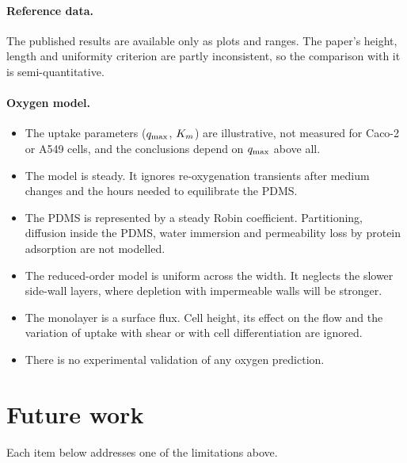 \paragraph{Reference data.} The published results are available only as plots and ranges. The paper's height, length and uniformity criterion are partly inconsistent, so the comparison with it is semi-quantitative.

\paragraph{Oxygen model.}
\begin{itemize}
\item The uptake parameters ($q_{\max}$, $K_{m}$) are illustrative, not measured for Caco-2 or A549 cells, and the conclusions depend on $q_{\max}$ above all.
\item The model is steady. It ignores re-oxygenation transients after medium changes and the hours needed to equilibrate the PDMS.
\item The PDMS is represented by a steady Robin coefficient. Partitioning, diffusion inside the PDMS, water immersion and permeability loss by protein adsorption are not modelled.
\item The reduced-order model is uniform across the width. It neglects the slower side-wall layers, where depletion with impermeable walls will be stronger.
\item The monolayer is a surface flux. Cell height, its effect on the flow and the variation of uptake with shear or with cell differentiation are ignored.
\item There is no experimental validation of any oxygen prediction.
\end{itemize}

\section{Future work}

Each item below addresses one of the limitations above.

